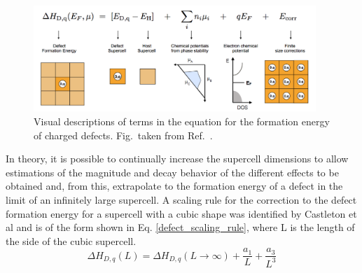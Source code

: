 \documentclass[11pt, twoside]{report}
\begin{document}
\begin{figure}[h!]
  \centering
    \includegraphics[width=0.95\textwidth]{figures/pylada_eq.png}
    \caption[Visual descriptions of terms in the equation for the formation energy of charged defects.]{Visual descriptions of terms in the equation for the formation energy of charged defects. Fig.~taken from Ref.~.}
  \label{pylada_eq}
\end{figure}

In theory, it is possible to continually increase the supercell dimensions to allow estimations of the magnitude and decay behavior of the different effects to be obtained and, from this, extrapolate to the formation energy of a defect in the limit of an infinitely large supercell. A scaling rule for the correction to the defect formation energy for a supercell with a cubic shape was identified by Castleton et al \cite{supercell_scaling} and is of the form shown in Eq. \ref{defect_scaling_rule}, where L is the length of the side of the cubic supercell.
\begin{equation}\label{defect_scaling_rule}
\Delta H_{D,q}(L) = \Delta H_{D,q}(L \rightarrow \infty) + \frac{a_1}{L} + \frac{a_3}{L^3}
\end{equation}
\end{document}
